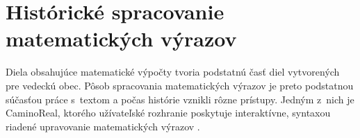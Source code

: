 \documentclass[a4paper,11pt]{article}
\begin{document}
	
	\section{Histórické spracovanie matematických výrazov}
	Diela obsahujúce matematické výpočty tvoria podstatnú časť diel vytvorených pre vedeckú obec. Pôsob spracovania matematických výrazov je preto podstatnou súčasťou práce s~textom a počas histórie vznikli rôzne prístupy. Jedným z~nich je CaminoReal, ktorého užívateľské rozhranie poskytuje interaktívne, syntaxou riadené upravovanie matematických výrazov \cite{Conf:proc}.
	

\newpage

\end{document}
